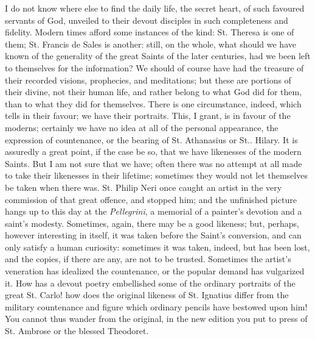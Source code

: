 I do not know where else to find the daily life, the secret heart,
of such favoured servants of God, unveiled to their devout disciples
in such completeness and fidelity. Modern times afford some instances
of the kind: St. Theresa is one of them; St. Francis de Sales is
another: still, on the whole, what should we have known of the
generality of the great Saints of the later centuries, had we been
left to themselves for the information? We should of course have had
the treasure of their recorded visions, prophecies, and meditations;
but these are portions of their divine, not their human life, and
rather belong to what God did for them, than to what they did for
themselves. There is one circumstance, indeed, which tells in their
favour; we have their portraits. This, I grant, is in favour of the
moderns; certainly we have no idea at all of the personal appearance,
the expression of countenance, or the bearing of St. Athanasius or
St.. Hilary. It is assuredly a great point, if the case be so,
that we have likenesses of the modern Saints. But I am not sure that
we have; often there was no attempt at all made to take their
likenesses in their lifetime; sometimes they would not let themselves
be taken when there was. St. Philip Neri once caught an artist in the
very commission of that great offence, and stopped him; and the
unfinished picture hangs up to this day at the \emph{Pellegrini}, a
memorial of a painter's devotion and a saint's modesty. Sometimes,
again, there may be a good likeness; but, perhaps, however interesting
in itself, it was taken before the Saint's conversion, and can only
satisfy a human curiosity: sometimes it was taken, indeed, but has
been lost, and the copies, if there are any, are not to be trusted.
Sometimes the artist's veneration has idealized the countenance, or
the popular demand has vulgarized it. How has a devout poetry
embellished some of the ordinary portraits of the great St. Carlo! how
does the original likeness of St. Ignatius differ from the military
countenance and figure which ordinary pencils have bestowed upon him!
You cannot thus wander from the original, in the new edition you put
to press of St. Ambrose or the blessed Theodoret.

